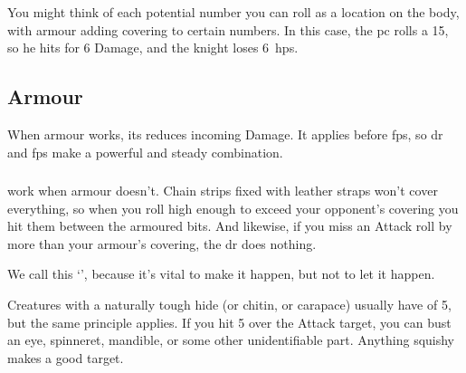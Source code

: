 \begin{multicols}{2}
{  You might think of each potential number you can roll as a location on the body, with armour adding \gls{covering} to certain numbers.
  In this case, the \gls{pc} rolls a 15, so he hits for 6 Damage, and the knight loses 6~\glspl{hp}.

}{

}

\columnbreak
\subsection{Armour}

When armour works, its  reduces incoming Damage.
It applies before \glspl{fp}, so \gls{dr} and \glspl{fp} make a powerful and steady combination.

\subsubsection{}
\label{vitals}
work when armour doesn't.
Chain strips fixed with leather straps won't cover everything, so when you roll high enough to exceed your opponent's \gls{covering} you hit them between the armoured bits.
And likewise, if you miss an Attack roll by more than your armour's \gls{covering}, the \gls{dr} does nothing.

We call this `', because it's vital to make it happen, but not to let it happen.

Creatures with a naturally tough hide (or chitin, or carapace) usually have  of 5, but the same principle applies.
If you hit 5 over the Attack target, you can bust an eye, spinneret, mandible, or some other unidentifiable part.
Anything squishy makes a good target.

\armourchart


\end{multicols}

